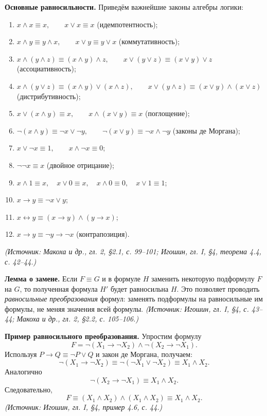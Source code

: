 \documentclass[a4paper,12pt]{article}
\begin{document}
\textbf{Основные равносильности.} Приведём важнейшие законы алгебры логики:
\begin{enumerate}[label=\arabic*)]
\item \(x\land x\equiv x,\qquad x\lor x\equiv x\) \hfill (идемпотентность);
\item \(x\land y\equiv y\land x,\qquad x\lor y\equiv y\lor x\) \hfill (коммутативность);
\item \(x\land(y\land z)\equiv(x\land y)\land z,\qquad x\lor(y\lor z)\equiv(x\lor y)\lor z\) \hfill (ассоциативность);
\item \(x\land(y\lor z)\equiv(x\land y)\lor(x\land z),\qquad
x\lor(y\land z)\equiv(x\lor y)\land(x\lor z)\) \hfill (дистрибутивность);
\item \(x\lor(x\land y)\equiv x,\qquad x\land(x\lor y)\equiv x\) \hfill (поглощение);
\item \(\neg(x\land y)\equiv\neg x\lor\neg y,\qquad
\neg(x\lor y)\equiv\neg x\land\neg y\) \hfill (законы де Моргана);
\item \(x\lor\neg x\equiv 1,\qquad x\land\neg x\equiv 0\);
\item \(\neg\neg x\equiv x\) \hfill (двойное отрицание);
\item \(x\land 1\equiv x,\quad x\lor 0\equiv x,\quad
x\land 0\equiv 0,\quad x\lor 1\equiv 1\);
\item \(x\to y\equiv\neg x\lor y\);
\item \(x\leftrightarrow y\equiv(x\to y)\land(y\to x)\);
\item \(x\to y\equiv\neg y\to\neg x\) \hfill (контрапозиция).
\end{enumerate}
\textit{(Источник: Макоха и др., гл. 2, §2.1, с. 99--101; Игошин, гл. I, §4, теорема 4.4, с. 42--44.)}

\textbf{Лемма о замене.} Если \(F\equiv G\) и в формуле \(H\) заменить некоторую подформулу \(F\) на \(G\), то полученная формула \(H'\) будет равносильна \(H\). Это позволяет проводить \emph{равносильные преобразования} формул: заменять подформулы на равносильные им формулы, не меняя значения всей формулы.
\textit{(Источник: Игошин, гл. I, §4, с. 43--44; Макоха и др., гл. 2, §2.2, с. 105--106.)}

\textbf{Пример равносильного преобразования.} Упростим формулу
\[
F=\neg(X_1\to\neg X_2)\land\neg(X_2\to\neg X_1).
\]
Используя \(P\to Q\equiv\neg P\lor Q\) и закон де Моргана, получаем:
\[
\neg(X_1\to\neg X_2)
\equiv
\neg(\neg X_1\lor\neg X_2)
\equiv
X_1\land X_2.
\]
Аналогично
\[
\neg(X_2\to\neg X_1)\equiv X_1\land X_2.
\]
Следовательно,
\[
F\equiv(X_1\land X_2)\land(X_1\land X_2)\equiv X_1\land X_2.
\]
\textit{(Источник: Игошин, гл. I, §4, пример 4.6, с. 44.)}
\end{document}
